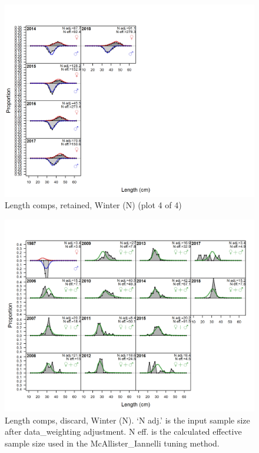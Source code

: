 \documentclass[12pt,]{article}
\begin{document}
\begin{figure}
\centering
\includegraphics{r4ss/plots_mod1/comp_lenfit_flt1mkt2_page4.png}
\caption{Length comps, retained, Winter (N) (plot 4 of 4)
\label{fig:length_fits}}
\end{figure}

\begin{figure}
\centering
\includegraphics{r4ss/plots_mod1/comp_lenfit_flt1mkt1.png}
\caption{Length comps, discard, Winter (N). `N adj.' is the input sample
size after data\_weighting adjustment. N eff. is the calculated
effective sample size used in the McAllister\_Iannelli tuning method.
\label{fig:length_fits}}
\end{figure}
\end{document}
